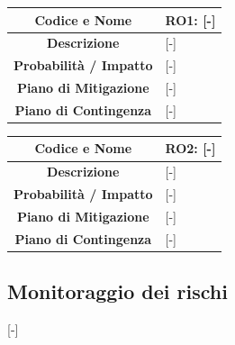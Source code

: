 \begin{table}[H]
	\centering
	\renewcommand{\arraystretch}{1.3}
	\begin{tabularx}{\textwidth}{|c|X|}
		\hline
		\textbf{Codice e Nome} & \textbf{RO1: [-]} \\
		\hline
		\textbf{Descrizione} & [-] \\
		\hline
		\textbf{Probabilità / Impatto} & [-] \\
		\hline
		\textbf{Piano di Mitigazione} & [-] \\
		\hline
		\textbf{Piano di Contingenza} & [-] \\
		\hline
	\end{tabularx}
\end{table}

\begin{table}[H]
	\centering
	\renewcommand{\arraystretch}{1.3}
	\begin{tabularx}{\textwidth}{|c|X|}
		\hline
		\textbf{Codice e Nome} & \textbf{RO2: [-]} \\
		\hline
		\textbf{Descrizione} & [-] \\
		\hline
		\textbf{Probabilità / Impatto} & [-] \\
		\hline
		\textbf{Piano di Mitigazione} & [-] \\
		\hline
		\textbf{Piano di Contingenza} & [-] \\
		\hline
	\end{tabularx}
\end{table}

\subsection{Monitoraggio dei rischi}
[-]